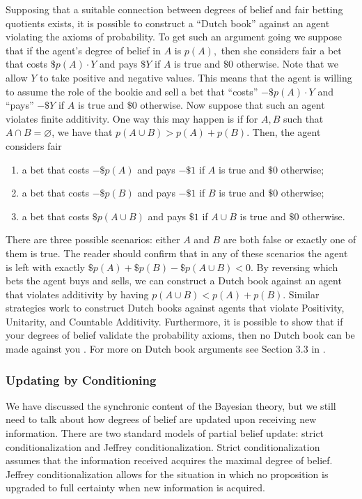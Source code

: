 Supposing that a suitable connection between degrees of belief and fair betting
quotients exists, it is possible to construct a ``Dutch book'' against an agent
violating the axioms of probability. To get such an argument going we suppose
that if the agent's degree of belief in $A$ is $p(A),$ then she considers fair a
bet that costs $\$ p(A)\cdot Y$ and pays $\$Y$ if $A$ is true and $\$0$
otherwise. Note that we allow $Y$ to take positive and negative values. This
means that the agent is willing to assume the role of the bookie and sell a bet
that ``costs'' $-\$ p(A)\cdot Y$ and ``pays'' $-\$Y$ if $A$ is true and $\$0$
otherwise. Now suppose that such an agent violates finite additivity. One way
this may happen is if for $A,B$ such that $A\cap B = \varnothing$, we have that
$p(A\cup B) > p(A) + p(B).$ Then, the agent considers fair
\begin{enumerate}
\item a bet that costs $-\$p(A)$ and pays $-\$ 1$ if $A$ is true and $\$ 0$
otherwise; 
\item a bet that costs $-\$p(B)$ and pays $-\$ 1$ if $B$ is true and $\$ 0$
otherwise; 
\item a bet that costs $\$p(A\cup B)$ and pays $\$1$ if $A\cup B$ is true and
$\$0$ otherwise.
\end{enumerate}
There are three possible scenarios: either $A$ and $B$ are both false or exactly
one of them is true. The reader should confirm that in any of these scenarios
the agent is left with exactly $ \$p(A) + \$p(B) - \$p(A\cup B) < 0.$ By
reversing which bets the agent buys and sells, we can construct a Dutch book
against an agent that violates additivity by having $p(A\cup B) < p(A) + p(B).$
Similar strategies work to construct Dutch books against agents that violate
Positivity, Unitarity, and Countable Additivity. Furthermore, it is possible to
show that if your degrees of belief validate the probability axioms, then no
Dutch book can be made against you \citep{kemeny1955fair}. For more on Dutch
book arguments see Section 3.3 in \citet{sep-probability-interpret}.

\subsubsection{Updating by Conditioning}

We have discussed the synchronic content of the Bayesian theory, but we still
need to talk about how degrees of belief are updated upon receiving new
information. There are two standard models of partial belief update: strict
conditionalization and Jeffrey conditionalization. Strict conditionalization
assumes that the information received acquires the maximal degree of belief.
Jeffrey conditionalization allows for the situation in which no proposition is
upgraded to full certainty when new information is acquired.

